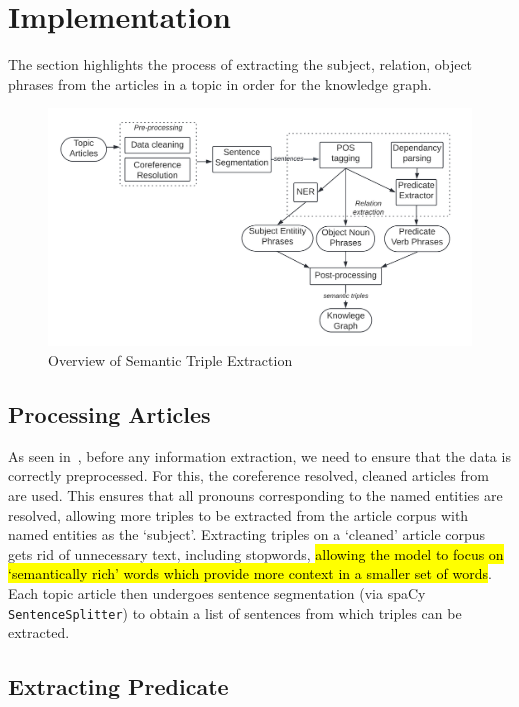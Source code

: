 \section{Implementation}

The section highlights the process of extracting the subject, relation, object phrases from the articles in a topic in order for the knowledge graph. 

\begin{figure}[H]
  \centering
  \includegraphics[scale=0.17]{images/ste_imp.png}
  \vspace{-2ex}
  \caption{Overview of Semantic Triple Extraction}
  \label{fig:rel_overview}
\end{figure}

\subsection*{Processing Articles}
As seen in~, before any information extraction, we need to ensure that the data is correctly preprocessed. For this, the coreference resolved, cleaned articles from   are used. This ensures that all pronouns corresponding to the named entities are resolved, allowing more triples to be extracted from the article corpus with named entities as the `subject'. Extracting triples on a `cleaned' article corpus gets rid of unnecessary text, including stopwords, \hl{allowing the model to focus on `semantically rich' words which provide more context in a smaller set of words}. Each topic article then undergoes sentence segmentation (via spaCy \texttt{SentenceSplitter}) to obtain a list of sentences from which triples can be extracted.

\subsection*{Extracting Predicate}


